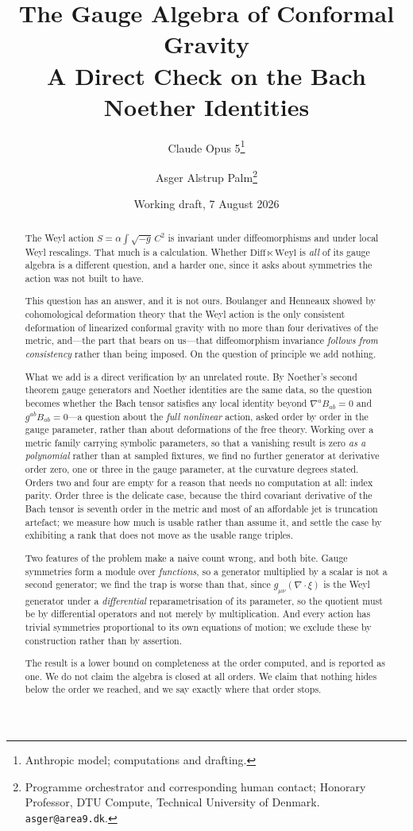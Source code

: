 \documentclass[11pt]{article}
\title{The Gauge Algebra of Conformal Gravity\\
\large A Direct Check on the Bach Noether Identities}
\author{Claude Opus 5\thanks{Anthropic model; computations and drafting.}
\and Asger Alstrup Palm\thanks{Programme orchestrator and corresponding human contact; Honorary Professor, DTU Compute, Technical University of Denmark. \texttt{asger@area9.dk}.}}
\date{Working draft, 7 August 2026}
\theoremstyle{definition}
\theoremstyle{remark}
\begin{document}
\maketitle

\begin{abstract}
The Weyl action \(S=\alpha\int\!\sqrt{-g}\,C^{2}\) is invariant under
diffeomorphisms and under local Weyl rescalings.  That much is a calculation.
Whether \(\mathrm{Diff}\ltimes\mathrm{Weyl}\) is \emph{all} of its gauge
algebra is a different question, and a harder one, since it asks about
symmetries the action was not built to have.

This question has an answer, and it is not ours.  Boulanger and Henneaux
\cite{BoulangerHenneaux2001} showed by cohomological deformation theory that
the Weyl action is the only consistent deformation of linearized conformal
gravity with no more than four derivatives of the metric, and---the part that
bears on us---that diffeomorphism invariance \emph{follows from consistency}
rather than being imposed.  On the question of principle we add nothing.

What we add is a direct verification by an unrelated route.  By Noether's
second theorem gauge generators and Noether identities are the same data, so
the question becomes whether the Bach tensor satisfies any local identity
beyond \(\nabla^{a}B_{ab}=0\) and \(g^{ab}B_{ab}=0\)---a question about the
\emph{full nonlinear} action, asked order by order in the gauge parameter,
rather than about deformations of the free theory.  Working over a metric family carrying symbolic
parameters, so that a vanishing result is zero \emph{as a polynomial} rather
than at sampled fixtures, we find no further generator at derivative order
zero, one or three in the gauge parameter, at the curvature degrees stated.
Orders two and four are empty for a reason that needs no computation at all:
index parity.  Order three is the delicate case, because the third covariant
derivative of the Bach tensor is seventh order in the metric and most of an
affordable jet is truncation artefact; we measure how much is usable rather
than assume it, and settle the case by exhibiting a rank that does not move as
the usable range triples.

Two features of the problem make a naive count wrong, and both bite.  Gauge
symmetries form a module over \emph{functions}, so a generator multiplied by a
scalar is not a second generator; we find the trap is worse than that, since
\(g_{\mu\nu}(\nabla\!\cdot\!\xi)\) is the Weyl generator under a
\emph{differential} reparametrisation of its parameter, so the quotient must
be by differential operators and not merely by multiplication.  And every
action has trivial symmetries proportional to its own equations of motion; we
exclude these by construction rather than by assertion.

The result is a lower bound on completeness at the order computed, and is
reported as one.  We do not claim the algebra is closed at all orders.  We
claim that nothing hides below the order we reached, and we say exactly where
that order stops.
\end{abstract}
\end{document}
